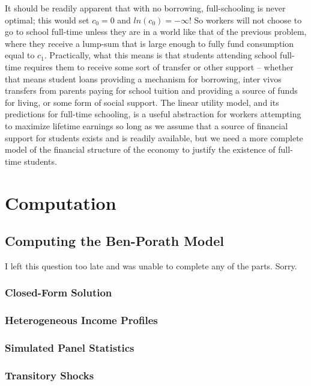 \documentclass[12pt, letterpaper, parskip = full]{article}
\begin{document}
    It should be readily apparent that with no borrowing, full-schooling is never optimal; this would set \(c_0 = 0\) and \(ln(c_0) = - \infty\)! So workers will not choose to go to school full-time unless they are in a world like that of the previous problem, where they receive a lump-sum that is large enough to fully fund consumption equal to \(c_1\). Practically, what this means is that students attending school full-time requires them to receive some sort of transfer or other support -- whether that means student loans providing a mechanism for borrowing, inter vivos transfers from parents paying for school tuition and providing a source of funds for living, or some form of social support. The linear utility model, and its predictions for full-time schooling, is a useful abstraction for workers attempting to maximize lifetime earnings so long as we assume that a source of financial support for students exists and is readily available, but we need a more complete model of the financial structure of the economy to justify the existence of full-time students.

    \section{Computation}

    \subsection{Computing the Ben-Porath Model}

    I left this question too late and was unable to complete any of the parts. Sorry.

    \subsubsection{Closed-Form Solution}

    \subsubsection{Heterogeneous Income Profiles}

    \subsubsection{Simulated Panel Statistics}

    \subsubsection{Transitory Shocks}
\end{document}
